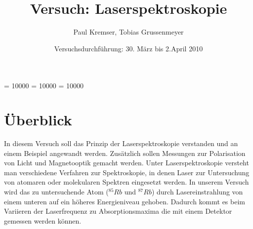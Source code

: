 \documentclass[12pt]{article}
\newcommand{\changefont}[3]{
\fontfamily{#1} \fontseries{#2} \fontshape{#3} \selectfont}
\begin{document}
\clubpenalty = 10000
\widowpenalty = 10000 
\displaywidowpenalty = 10000

\onehalfspacing
\changefont{ptm}{m}{n} 

\begin{titlepage}
\author{Paul Kremser, Tobias Grussenmeyer}
\title{Versuch: Laserspektroskopie}
\date{Versuchsdurchführung: 30. März bis 2.April 2010} 
\maketitle
\thispagestyle{empty}
\end{titlepage}

\tableofcontents
\thispagestyle{empty}
\newpage
{}
\section{Überblick}
In diesem Versuch soll das Prinzip der Laserspektroskopie verstanden und an einem Beispiel angewandt werden. Zusätzlich sollen Messungen zur Polarisation von
Licht und Magnetooptik gemacht werden.
Unter Laserspektroskopie versteht man verschiedene Verfahren zur Spektroskopie, in denen Laser zur Untersuchung von atomaren oder molekularen Spektren eingesetzt werden. 
In unserem Versuch wird das zu untersuchende Atom ($^{85}Rb$ und $^{87}Rb$) durch Lasereinstrahlung von einem unteren auf ein höheres Energieniveau gehoben.
Dadurch kommt es beim Variieren der Laserfrequenz zu Absorptionsmaxima die mit einem Detektor gemessen werden können.
\newpage
\end{document}
